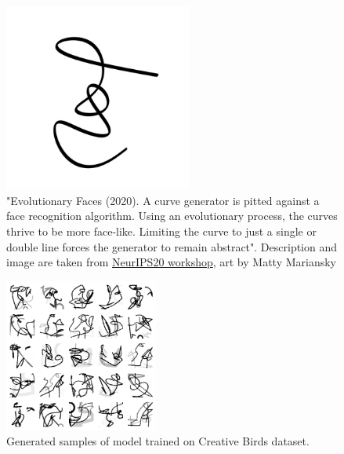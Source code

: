 \documentclass{article}
\begin{document}
	\appendix 
	
	
	\begin{figure}[h]
		\centering
		\includegraphics[width=0.55\textwidth]{img/face.jpg}
		\caption{"Evolutionary Faces (2020). A curve generator is pitted against a face recognition algorithm. Using an evolutionary process, the curves thrive to be more face-like. Limiting the curve to just a single or double line forces the generator to remain abstract". Description and image are taken from \href{http://www.aiartonline.com/highlights-2020/matty-mariansky/}{NeurIPS20 workshop}, art by Matty Mariansky}
		\label{fig:face}
	\end{figure}

\begin{figure}[h]
	\centering
	\includegraphics[width=0.45\textwidth]{img/gen_cr.png}
	\caption{Generated samples of model trained on Creative Birds dataset.}
	\label{fig:gen_creative}
\end{figure}
	
\end{document}
